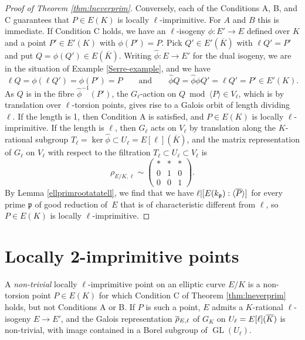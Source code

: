 \documentclass{amsart}
\theoremstyle{plain}
\theoremstyle{definition}
\DeclareMathOperator{\GL}{GL}
\newcommand{\gothp}{{\mathfrak{p}}}
\newcommand{\mybar}[1]{
  \mathchoice
  {#1\llap{$\overline{\phantom{\displaystyle\rm#1}}$}}
  {#1\llap{$\overline{\phantom{\textstyle\rm#1}}$}}
  {#1\llap{$\overline{\phantom{\scriptstyle\rm#1}}$}}
  {#1\llap{$\overline{\phantom{\scriptscriptstyle\rm#1}}$}}
}
\renewcommand{\bar}{\mybar}
\begin{document}
\begin{proof}[Proof of Theorem \ref{thm:lneverprim}]
Conversely, each of the Conditions A, B, and C guarantees that $P\in E(K)$ is locally
$\ell$-imprimitive. For $A$ and $B$ this is immediate.
If Condition C holds, we have an $\ell$-isogeny $\phi: E'\to E$ defined over $K$ and
a point $P'\in E'(K)$ with $\phi(P')=P$.
Pick $Q'\in E'(\overline K)$ with $\ell Q'=P'$ and put $Q=\phi(Q')\in E(\overline K)$.
Writing $\widehat\phi: E\to E'$ for the dual isogeny, we are in the situation of Example 
\ref{Serre-example}, and we have 
\[
\ell Q=\phi(\ell Q')=\phi(P')=P\qquad \text{and} \qquad
\widehat\phi Q= \widehat\phi \phi Q'= \ell Q'=P'\in E'(K).
\]
As $Q$ is in the fibre $\widehat\phi^{-1}(P')$, the $G_\ell$-action on $Q \bmod \langle P\rangle\in V_\ell$, 
which is by translation over $\ell$-torsion points, gives rise to a Galois orbit of length dividing $\ell$.
If the length is 1, then Condition A is satisfied, and $P\in E(K)$ is locally $\ell$-imprimitive.
If the length is $\ell$, then $G_\ell$ acts on $V_\ell$ by translation along the $K$-rational subgroup
$T_\ell=\ker\widehat\phi\subset U_\ell=E[\ell](\overline K)$, and the matrix representation of $G_\ell$ on $V_\ell$
with respect to the filtration $T_\ell\subset U_\ell\subset V_\ell$ is
\[
\rho_{E/K,\ell} \sim 
\begin{pmatrix}
* & * & * \\
0 & 1 & 0 \\
0 & 0 & 1
\end{pmatrix}.
\]
By Lemma \ref{ellprimrootatatell}, we find that we have 
$\ell | [E(k_\gothp):\langle {\bar P}\rangle ]$ for every prime 
$\gothp$ of good reduction of~$E$ that is of characteristic different from $\ell$,
so $P\in E(K)$ is locally $\ell$-imprimitive.
\end{proof}
\section{Locally 2-imprimitive points}
\label{S:Locally 2-imprimitive points}
\noindent
A \emph{non-trivial} locally $\ell$-imprimitive point on an elliptic curve $E/K$
is a non-torsion point $P\in E(K)$ for which Condition C of 
Theorem \ref{thm:lneverprim} holds, but not Conditions A or B.
If $P$ is such a point, $E$ admits a $K$-rational $\ell$-isogeny $E\to E'$, 
and the Galois representation $\bar\rho_{E, \ell}$ of $G_K$ on  
$U_\ell=E[\ell](\bar K)$  
is non-trivial, with image contained in a Borel subgroup of $\GL(U_\ell)$.
\end{document}
